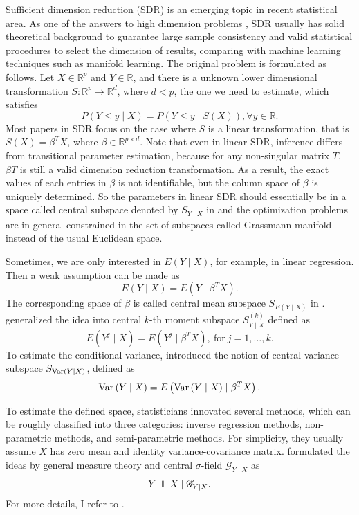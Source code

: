 Sufficient dimension reduction (SDR) is an emerging topic in recent
statistical area. As one of the answers to high dimension problems
, SDR usually has solid theoretical background to guarantee large
sample consistency and valid statistical procedures to select the
dimension of results, comparing with machine learning techniques such
as manifold learning. The original problem is formulated as follows.
Let $X\in\mathbb{R}^{p}$ and $Y\in\mathbb{R}$, and there is a unknown
lower dimensional transformation $S:\mathbb{R}^{p}\rightarrow\mathbb{R}^{d}$,
where $d<p$, the one we need to estimate, which satisfies 
\[
P\left(Y\le y\mid X\right)=P\left(Y\le y\mid S\left(X\right)\right),\forall y\in \mathbb{R}.
\]
Most papers in SDR focus on the case where  $S$ is a
linear transformation, that is $S\left(X\right)=\beta^{T}X$, where
$\beta\in\mathbb{R}^{p\times d}$. Note that even in linear SDR, 
inference differs from transitional parameter estimation, because
for any non-singular matrix $T$, $\beta T$ is still a valid dimension
reduction transformation. As a result, the exact values of each
entries in $\beta$ is not identifiable, but the column space of $\beta$
is uniquely determined. So the parameters in linear SDR should essentially
be in a space called central subspace denoted by $S_{Y\mid X}$ in \citet{cook1994interpretation}
and the optimization problems are in general
constrained in the set of subspaces called Grassmann manifold instead
of the usual Euclidean space. %
\begin{comment}
non-linear dr by cond on sigma algebra
\end{comment}
Sometimes, we are only interested in $E\left(Y\mid X\right)$, for
example, in linear regression. Then a weak assumption can be made
as 
\[
E\left(Y\mid X\right)=E\left(Y\mid\beta^{T}X\right).
\]
The corresponding space of $\beta$ is called central mean subspace
$S_{E\left(Y\mid X\right)}$ in \citet{cook2002dimension}. \citet{yin2002dimension}
generalized the idea into central $k$-th moment subspace $S_{Y\mid X}^{\left(k\right)}$
defined as 
\[
E\left(Y^{j}\mid X\right)=E\left(Y^{j}\mid\beta^{T}X\right),\mathrm{\: for\:}j=1,\ldots,k.
\]
 To estimate the conditional variance, \citet{zhu2009dimension} introduced
the notion of central variance subspace $S_{\mathrm{Var}\left(Y\mid X\right)}$,
defined as 
\[
\mathrm{Var}\left(Y\mid X\right)=E\left(\mathrm{Var}\left(Y\mid X\right)\mid\beta^{T}X\right).
\]


To estimate the defined space, statisticians innovated several methods,
which can be roughly classified into three categories: inverse regression
methods, non-parametric methods, and semi-parametric methods. For
simplicity, they usually assume $X$ has zero mean and identity variance-covariance
matrix. \citet{lee2013general} formulated the ideas by general measure
theory and central $\sigma$-field $\mathscr{G}_{Y\mid X}$ as 
\[
Y\independent X\mid\mathscr{G}_{Y\mid X}.
\]
 For more details, I refer to \citet{ma2013review}.


